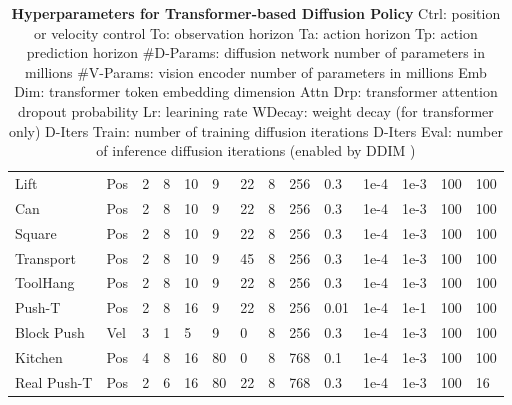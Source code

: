 \documentclass[Afour,sageh,times]{sagej}
\begin{document}
\begin{table}
\begin{tabular}{l|lllllllllllll}
\midrule
Lift       & Pos  & 2  & 8  & 10 & 9        & 22       & 8      & 256     & 0.3          & 1e-4 & 1e-3   & 100           & 100          \\
Can        & Pos  & 2  & 8  & 10 & 9        & 22       & 8      & 256     & 0.3          & 1e-4 & 1e-3   & 100           & 100          \\
Square     & Pos  & 2  & 8  & 10 & 9        & 22       & 8      & 256     & 0.3          & 1e-4 & 1e-3   & 100           & 100          \\
Transport  & Pos  & 2  & 8  & 10 & 9        & 45       & 8      & 256     & 0.3          & 1e-4 & 1e-3   & 100           & 100          \\
ToolHang   & Pos  & 2  & 8  & 10 & 9        & 22       & 8      & 256     & 0.3          & 1e-4 & 1e-3   & 100           & 100          \\
Push-T     & Pos  & 2  & 8  & 16 & 9        & 22       & 8      & 256     & 0.01         & 1e-4 & 1e-1   & 100           & 100          \\
Block Push & Vel  & 3  & 1  & 5  & 9        & 0        & 8      & 256     & 0.3          & 1e-4 & 1e-3   & 100           & 100          \\
Kitchen    & Pos  & 4  & 8  & 16 & 80       & 0        & 8      & 768     & 0.1          & 1e-4 & 1e-3   & 100           & 100          \\
\midrule
Real Push-T     & Pos  & 2  & 6  & 16 & 80      & 22       & 8      & 768     & 0.3          & 1e-4 & 1e-3   & 100           & 16           \\
\bottomrule
\end{tabular}%
\caption{
\textbf{Hyperparameters for Transformer-based Diffusion Policy}
\label{tab:hparam_transformer}
Ctrl: position or velocity control 
To: observation horizon 
Ta: action horizon 
Tp: action prediction horizon 
\#D-Params: diffusion network number of parameters in millions 
\#V-Params: vision encoder number of parameters in millions 
Emb Dim: transformer token embedding dimension
Attn Drp: transformer attention dropout probability
Lr: learining rate 
WDecay: weight decay (for transformer only)
D-Iters Train: number of training diffusion iterations
D-Iters Eval: number of inference diffusion iterations (enabled by DDIM \cite{song2021ddim})
}
\vspace{-5mm}
\end{table}
\end{document}

